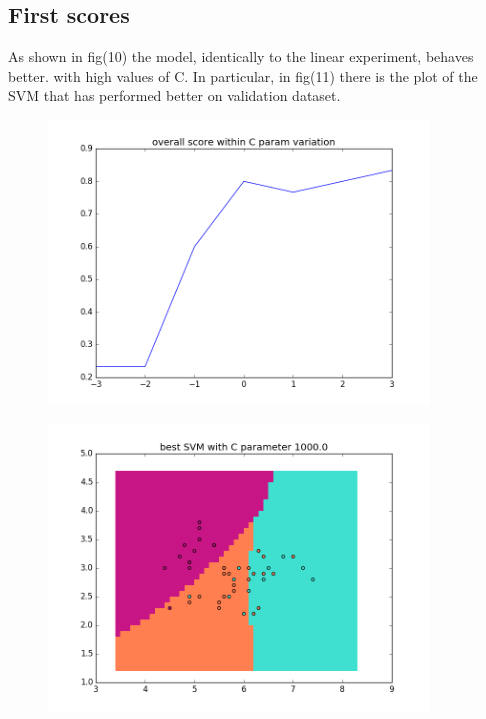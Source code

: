 \documentclass{article}
\begin{document}
\subsection{First scores}
				As shown in fig(10) the model, identically to the linear experiment, behaves better. with high values of C. In particular, in fig(11) there is the plot of the SVM that has performed better on validation dataset.
				\begin{center}
\begin{figure}
\centering
\includegraphics[width=0.9\textwidth]{figure_17}
\caption{}
\label{fig:10}
\end{figure}
\end{center}

				\begin{center}
\begin{figure}
\centering
\includegraphics[width=0.9\textwidth]{figure_18}
\caption{}
\label{fig:11}
\end{figure}
\end{center}
\end{document}
